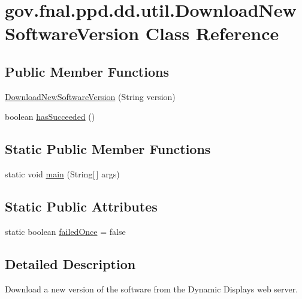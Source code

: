 \hypertarget{classgov_1_1fnal_1_1ppd_1_1dd_1_1util_1_1DownloadNewSoftwareVersion}{\section{gov.\-fnal.\-ppd.\-dd.\-util.\-Download\-New\-Software\-Version Class Reference}
\label{classgov_1_1fnal_1_1ppd_1_1dd_1_1util_1_1DownloadNewSoftwareVersion}
}
\subsection*{Public Member Functions}
\begin{DoxyCompactItemize}
\item 
\hyperlink{classgov_1_1fnal_1_1ppd_1_1dd_1_1util_1_1DownloadNewSoftwareVersion_a9a66f120b2ba0510d7b7972de80da51f}{Download\-New\-Software\-Version} (String version)
\item 
boolean \hyperlink{classgov_1_1fnal_1_1ppd_1_1dd_1_1util_1_1DownloadNewSoftwareVersion_a52e23aa564f9a29136d2e4b60205514e}{has\-Succeeded} ()
\end{DoxyCompactItemize}
\subsection*{Static Public Member Functions}
\begin{DoxyCompactItemize}
\item 
static void \hyperlink{classgov_1_1fnal_1_1ppd_1_1dd_1_1util_1_1DownloadNewSoftwareVersion_a2e54ce8c9ddc405b08e518931c9544e6}{main} (String\mbox{[}$\,$\mbox{]} args)
\end{DoxyCompactItemize}
\subsection*{Static Public Attributes}
\begin{DoxyCompactItemize}
\item 
static boolean \hyperlink{classgov_1_1fnal_1_1ppd_1_1dd_1_1util_1_1DownloadNewSoftwareVersion_ab4dfef8f6d3204b58e58d82e514324b0}{failed\-Once} = false
\end{DoxyCompactItemize}


\subsection{Detailed Description}
Download a new version of the software from the Dynamic Displays web server.

